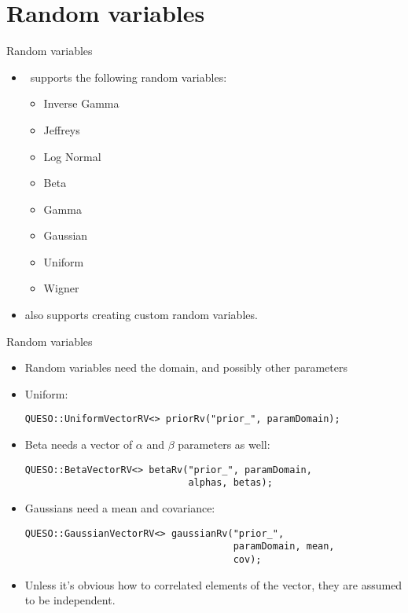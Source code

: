 \section{Random variables}
\begin{frame}[fragile]{Random variables}
  \begin{itemize}
    \item \Queso\ supports the following random variables:
      \begin{itemize}
        \item Inverse Gamma
        \item Jeffreys
        \item Log Normal
        \item Beta
        \item Gamma
        \item Gaussian
        \item Uniform
        \item Wigner
      \end{itemize}
    \item \Queso also supports creating custom random variables.
  \end{itemize}
\end{frame}

\begin{frame}[fragile]{Random variables}
  \begin{itemize}
    \item Random variables need the domain, and possibly other parameters
    \item Uniform:
      \begin{verbatim}
QUESO::UniformVectorRV<> priorRv("prior_", paramDomain); \end{verbatim}
    \item Beta needs a vector of $\alpha$ and $\beta$ parameters as well:
      \begin{verbatim}
QUESO::BetaVectorRV<> betaRv("prior_", paramDomain,
                             alphas, betas);\end{verbatim}
    \item Gaussians need a mean and covariance:
      \begin{verbatim}
QUESO::GaussianVectorRV<> gaussianRv("prior_",
                                     paramDomain, mean,
                                     cov); \end{verbatim}
    \item Unless it's obvious how to correlated elements of the vector, they
      are assumed to be independent.
  \end{itemize}
\end{frame}

